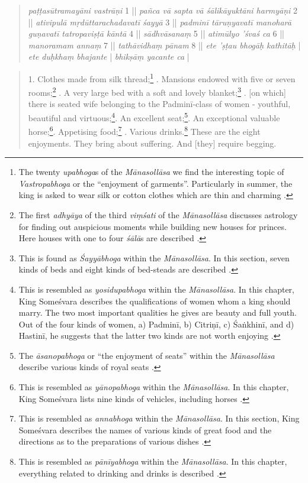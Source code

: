 \begin{quote}
\textit{paṭṭasūtramayāni vastrāṇi} 1 || \textit{pañca vā sapta vā śālikāyuktāni harmyāṇi} 2 || \textit{ativipulā mṛdūttarachadavatī śayyā} 3 || \textit{padminī tāruṇyavatī manoharā guṇavatī tatropaviṣṭā kāntā} 4 || \textit{sādhvāsanaṃ} 5 || \textit{atimūlyo 'śvaś ca} 6 || \textit{manoramam annaṃ} 7 || \textit{tathāvidhaṃ pānam} 8 || \textit{ete 'ṣṭau bhogāḥ kathitāḥ} | \textit{ete duḥkhaṃ bhajante} | \textit{bhikṣāṃ yacante ca} |
\end{quote}
\begin{quote}
  1. Clothes made from silk thread;\footnote{The twenty \textit{upabhoga}s of the \textit{Mānasollāsa} we find the interesting topic of \textit{Vastropabhoga} or the ``enjoyment of garments''. Particularly in summer, the king is asked to wear silk or cotton clothes which are thin and charming \parencite[14]{manasollasa}.} \hfill {}. Mansions endowed with five or seven rooms;\footnote{The first \textit{adhyāya} of the third \textit{viṃśati} of the \textit{Mānasollāsa} discusses astrology for finding out auspicious moments while building new houses for princes. Here houses with one to four \textit{śālā}s are described \parencite[6-7]{manasollasa}.} \hfill {}. A very large bed with a soft and lovely blanket;\footnote{This is found as \textit{Śayyābhoga} within the \textit{Mānasollāsa}. In this section, seven kinds of beds and eight kinds of bed-steads are described \parencite[21]{manasollasa}.} \hfill {}. [on which] there is seated wife belonging to the Padminī-class of women - youthful, beautiful and virtuous;\footnote{This is resembled as \textit{yosidupabhoga} within the \textit{Mānasollāsa}. In this chapter, King Someśvara describes the qualifications of women whom a king should marry. The two most important qualities he gives are beauty and full youth. Out of the four kinds of women, a) Padminī, b) Citriṇī, c) Śaṅkhinī, and d) Hastinī, he suggests that the latter two kinds are not worth enjoying \parencite[21]{manasollasa}.}\hfill {}. An excellent seat;\footnote{The \textit{āsanopabhoga} or ``the enjoyment of seats'' within the \textit{Mānasollāsa} describe various kinds of royal seats \parencite[15]{manasollasa}.}\hfill {}. An exceptional valuable horse;\footnote{This is resembled as \textit{yānopabhoga} within the \textit{Mānasollāsa}. In this chapter, King Someśvara lists nine kinds of vehicles, including horses \parencite[24]{manasollasa}.}\hfill {}. Appetising food;\footnote{This is resembled as \textit{annabhoga} within the \textit{Mānasollāsa}. In this section, King Someśvara describes the names of various kinds of great food and the directions as to the preparations of various dishes \parencite[21]{manasollasa}.} \hfill {}. Various drinks.\footnote{This is resembled as \textit{pānīyabhoga} within the \textit{Mānasollāsa}. In this chapter, everything related to drinking and drinks is described \parencite[23]{manasollasa}.} \hfill \break
  These are the eight enjoyments. They bring about suffering. And [they] require begging.   
\end{quote}


